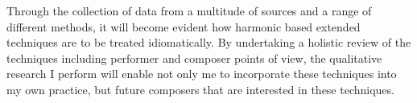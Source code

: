 Through the collection of data from a multitude of sources and a range of different methods, it will become evident how harmonic based extended techniques are to be treated idiomatically. By undertaking a holistic review of the techniques including performer and composer points of view, the qualitative research I perform will enable not only me to incorporate these techniques into my own practice, but future composers that are interested in these techniques.








